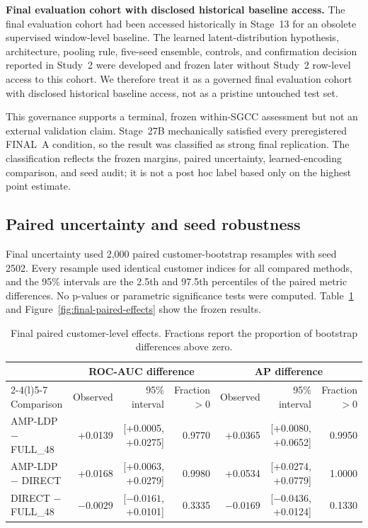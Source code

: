\textbf{Final evaluation cohort with disclosed historical baseline access.} The final evaluation cohort had been accessed historically in Stage~13 for an obsolete supervised window-level baseline. The learned latent-distribution hypothesis, architecture, pooling rule, five-seed ensemble, controls, and confirmation decision reported in Study~2 were developed and frozen later without Study~2 row-level access to this cohort. We therefore treat it as a governed final evaluation cohort with disclosed historical baseline access, not as a pristine untouched test set.

This governance supports a terminal, frozen within-SGCC assessment but not an external validation claim. Stage~27B mechanically satisfied every preregistered FINAL~A condition, so the result was classified as strong final replication. The classification reflects the frozen margins, paired uncertainty, learned-encoding comparison, and seed audit; it is not a post hoc label based only on the highest point estimate.

\subsection{Paired uncertainty and seed robustness}

Final uncertainty used 2,000 paired customer-bootstrap resamples with seed 2502. Every resample used identical customer indices for all compared methods, and the 95\% intervals are the 2.5th and 97.5th percentiles of the paired metric differences. No p-values or parametric significance tests were computed. Table~\ref{tab:final-paired-effects} and Figure~\ref{fig:final-paired-effects} show the frozen results.

\begin{table}[t]
\caption{Final paired customer-level effects. Fractions report the proportion of bootstrap differences above zero.}
\label{tab:final-paired-effects}
\centering
\small
\begin{tabular}{@{}lrrrrrr@{}}
\toprule
& \multicolumn{3}{c}{ROC-AUC difference} & \multicolumn{3}{c}{AP difference} \\
\cmidrule(lr){2-4}\cmidrule(l){5-7}
Comparison & Observed & 95\% interval & Fraction $>0$ & Observed & 95\% interval & Fraction $>0$ \\
\midrule
AMP-LDP $-$ FULL\_48 & +0.0139 & [+0.0005, +0.0275] & 0.9770 & +0.0365 & [+0.0080, +0.0652] & 0.9950 \\
AMP-LDP $-$ DIRECT & +0.0168 & [+0.0063, +0.0279] & 0.9980 & +0.0534 & [+0.0274, +0.0779] & 1.0000 \\
DIRECT $-$ FULL\_48 & $-0.0029$ & [$-0.0161$, +0.0101] & 0.3335 & $-0.0169$ & [$-0.0436$, +0.0124] & 0.1330 \\
\bottomrule
\end{tabular}
\end{table}

